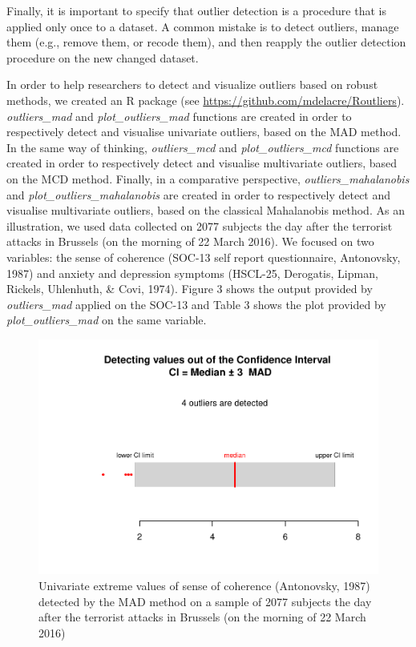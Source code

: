 \documentclass[man,floatsintext]{apa6}
\begin{document}
Finally, it is important to specify that outlier detection is a
procedure that is applied only once to a dataset. A common mistake is to
detect outliers, manage them (e.g., remove them, or recode them), and
then reapply the outlier detection procedure on the new changed dataset.

In order to help researchers to detect and visualize outliers based on
robust methods, we created an R package (see
\url{https://github.com/mdelacre/Routliers}). \emph{outliers\_mad} and
\emph{plot\_outliers\_mad} functions are created in order to
respectively detect and visualise univariate outliers, based on the MAD
method. In the same way of thinking, \emph{outliers\_mcd} and
\emph{plot\_outliers\_mcd} functions are created in order to
respectively detect and visualise multivariate outliers, based on the
MCD method. Finally, in a comparative perspective,
\emph{outliers\_mahalanobis} and \emph{plot\_outliers\_mahalanobis} are
created in order to respectively detect and visualise multivariate
outliers, based on the classical Mahalanobis method. As an illustration,
we used data collected on 2077 subjects the day after the terrorist
attacks in Brussels (on the morning of 22 March 2016). We focused on two
variables: the sense of coherence (SOC-13 self report questionnaire,
Antonovsky, 1987) and anxiety and depression symptoms (HSCL-25,
Derogatis, Lipman, Rickels, Uhlenhuth, \& Covi, 1974). Figure 3 shows
the output provided by \emph{outliers\_mad} applied on the SOC-13 and
Table 3 shows the plot provided by \emph{plot\_outliers\_mad} on the
same variable.

\begin{figure}
\centering
\includegraphics{Outliers_files/figure-latex/MADSOC-1.pdf}
\caption{\label{fig:MADSOC}Univariate extreme values of sense of coherence
(Antonovsky, 1987) detected by the MAD method on a sample of 2077
subjects the day after the terrorist attacks in Brussels (on the morning
of 22 March 2016)}
\end{figure}
\end{document}
